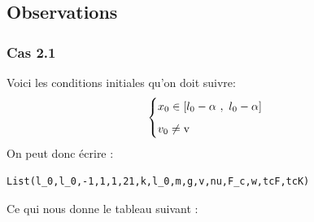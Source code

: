 \documentclass{article}
\begin{document}
\subsection{Observations}
\subsubsection{Cas 2.1}
Voici les conditions initiales qu'on doit suivre:
$$
\begin{cases}
	\vspace{.2cm}
	x_0 \in [l_0-\alpha~,~l_0-\alpha]\\
	v_0\neq \text{v}
\end{cases}
$$
On peut donc écrire :
\begin{lstlisting}
List(l_0,l_0,-1,1,1,21,k,l_0,m,g,v,nu,F_c,w,tcF,tcK)
\end{lstlisting}

Ce qui nous donne le tableau suivant :
\end{document}

